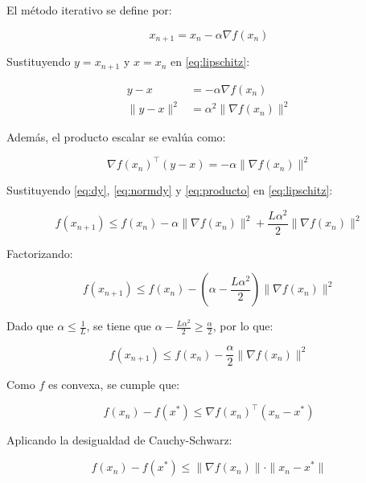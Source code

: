 \documentclass[conference]{IEEEtran}
\begin{document}
El método iterativo se define por:

\begin{equation}
x_{n+1} = x_n - \alpha \nabla f(x_n) \label{eq:iteracion}
\end{equation}

Sustituyendo $y = x_{n+1}$ y $x = x_n$ en \eqref{eq:lipschitz}:

\begin{align}
y - x &= -\alpha \nabla f(x_n) \label{eq:dy} \\
\|y - x\|^2 &= \alpha^2 \|\nabla f(x_n)\|^2 \label{eq:normdy}
\end{align}

Además, el producto escalar se evalúa como:

\begin{equation}
\nabla f(x_n)^\top (y - x) = -\alpha \|\nabla f(x_n)\|^2 \label{eq:producto}
\end{equation}

Sustituyendo \eqref{eq:dy}, \eqref{eq:normdy} y \eqref{eq:producto} en \eqref{eq:lipschitz}:

\begin{equation}
f(x_{n+1}) \leq f(x_n) - \alpha \|\nabla f(x_n)\|^2 + \frac{L \alpha^2}{2} \|\nabla f(x_n)\|^2
\end{equation}

Factorizando:

\begin{equation}
f(x_{n+1}) \leq f(x_n) - \left( \alpha - \frac{L \alpha^2}{2} \right) \|\nabla f(x_n)\|^2
\end{equation}

Dado que $\alpha \leq \frac{1}{L}$, se tiene que $\alpha - \frac{L \alpha^2}{2} \geq \frac{\alpha}{2}$, por lo que:

\begin{equation}
f(x_{n+1}) \leq f(x_n) - \frac{\alpha}{2} \|\nabla f(x_n)\|^2 \label{eq:desigualdad}
\end{equation}

Como $f$ es convexa, se cumple que:

\begin{equation}
f(x_n) - f(x^*) \leq \nabla f(x_n)^\top (x_n - x^*)
\end{equation}

Aplicando la desigualdad de Cauchy-Schwarz:

\begin{equation}
f(x_n) - f(x^*) \leq \|\nabla f(x_n)\| \cdot \|x_n - x^*\|
\end{equation}
\end{document}
